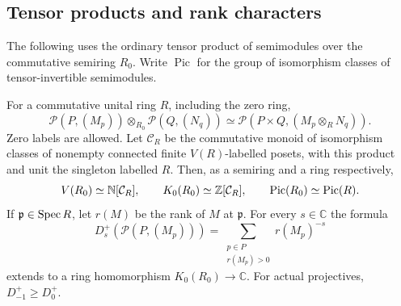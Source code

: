 \subsection{Tensor products and rank characters}
The following uses the ordinary tensor product of semimodules over the
commutative semiring $R_0$. Write $\operatorname{Pic}$ for the group of
isomorphism classes of tensor-invertible semimodules.

\begin{proposition}\label{prop:tensor-picard}
For a commutative unital ring $R$, including the zero ring,
\[
 \mathcal P(P,(M_p))\otimes_{R_0}\mathcal P(Q,(N_q))
 \simeq\mathcal P(P\times Q,(M_p\otimes_R N_q)).
\]
Zero labels are allowed. Let $\mathcal C_R$ be the commutative monoid of
isomorphism classes of nonempty connected finite $V(R)$-labelled posets,
with this product and unit the singleton labelled $R$. Then, as a
semiring and a ring respectively,
\[
 V(R_0)\simeq\mathbb N[\mathcal C_R],\qquad
 K_0(R_0)\simeq\mathbb Z[\mathcal C_R],\qquad
 \operatorname{Pic}(R_0)\simeq\operatorname{Pic}(R).
\]
If $\mathfrak p\in\operatorname{Spec} R$, let $r(M)$ be the rank of $M$ at
$\mathfrak p$. For every $s\in\mathbb C$ the formula
\[
 D_s^+(\mathcal P(P,(M_p)))
   =\sum_{\substack{p\in P\\r(M_p)>0}}r(M_p)^{-s}
\]
extends to a ring homomorphism $K_0(R_0)\to\mathbb C$.
For actual projectives, $D_{-1}^+\ge D_0^+$.
\end{proposition}
